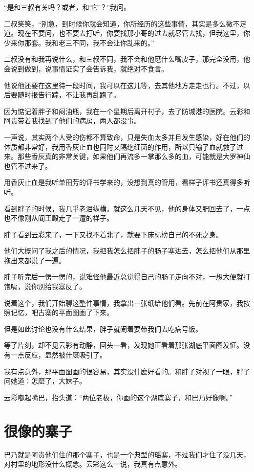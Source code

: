 “是和三叔有关吗？或者，和‘它’？”我问。

二叔笑笑，“别急，到时候你就会知道，你所经历的这些事情，其实是多么微不足道。现在不要问，也不要去打听，你要找那小哥的过去就尽管去找，但我这里，你少来你那套。我和老三不同，我不会让你乱来的。”

二叔没有和我再说什么，和三叔不同，我不会和他磨什么嘴皮子，那完全没用，他会说到做到，说事情证实了会告诉我，就绝对不食言。

他说他还要在这里待一段时间，我可以在这儿等，去其他地方走走也行。不过，以后要随时报告行踪，不让我再乱跑了。

因为惦记着胖子和闷油瓶，我在一个星期后离开村子，去了防城港的医院。云彩和阿贵带着我找到了他们的病房，两人都没事。

一声说，其实两个人受的伤都不算致命，只是失血太多并且发生感染，好在他们的体质都非常好，我用香灰止血也同时又隔绝细菌的作用，所以只输了血就救了过来。那些香灰真的非常关键，如果他们再流多一掌那么多的血，可能就是大罗神仙也管不过来了。

用香灰止血是我听单田芳的评书学来的，没想到真的管用，看样子评书还真得多听听。

看到胖子的时候，我几乎老泪纵横。就这么几天不见，他的身体又肥回去了，一点也不像刚从阎王殿走了一遭的样子。

胖子看到云彩来了，一下又找不着北了，就要下床标榜自己的不死之身。

他们大概问了我之后的情况，我把我怎么把胖子的肠子塞进去，怎么把他们从那里拖出来都说了一遍。

胖子听完后一愣一愣的，说难怪他最近总觉得自己的肠子走向不对，一想大便就打饱嗝，说你别给我塞反了。

说着这个，我们开始聊这整件事情，我拿出一张纸给他们看。先前在阿贵家，我按照记忆，吧古寨的平面图画了下来。

但是如此讨论也没有什么结果，胖子就闹着要带我们去吃病号饭。

等了片刻，却不见云彩有动静，回头一看，发现她正看着那张湖底平面图发怔。没有一点反应，显然被什麽吸引了。

我有点意外，那平面图画的很容易，其实没什麽好看的。和胖子对视了一眼，胖子问她道：怎麽了，大妹子。

云彩嘟起嘴巴，抬头道：“两位老板，你画的这个湖底寨子，和巴乃好像啊。”

\chapter{很像的寨子}

巴乃就是阿贵他们住的那个寨子，也是一个典型的瑶寨，不过我们才住了没几天，对村里的地形没什么概念。云彩这么一说，我真有点意外。

